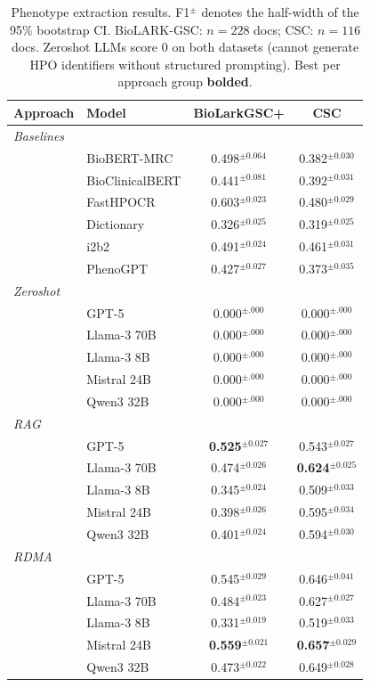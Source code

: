 \begin{table}[t]
\centering\small\setlength{\tabcolsep}{5pt}
\caption{Phenotype extraction results. F1$^{\pm}$ denotes the half-width of the 95\% bootstrap CI.
BioLARK-GSC: $n{=}228$ docs; CSC: $n{=}116$ docs.
Zeroshot LLMs score 0 on both datasets (cannot generate HPO identifiers without structured prompting).
Best per approach group \textbf{bolded}.}
\label{tab:phenotype_ci}
\begin{tabular}{llcc}
\toprule
\textbf{Approach} & \textbf{Model} & \textbf{BioLarkGSC+} & \textbf{CSC} \\
\midrule
\multicolumn{4}{l}{\textit{Baselines}} \\
& BioBERT-MRC & 0.498$^{\pm0.064}$ & 0.382$^{\pm0.030}$ \\
& BioClinicalBERT & 0.441$^{\pm0.081}$ & 0.392$^{\pm0.031}$ \\
& FastHPOCR & 0.603$^{\pm0.023}$ & 0.480$^{\pm0.029}$ \\
& Dictionary & 0.326$^{\pm0.025}$ & 0.319$^{\pm0.025}$ \\
& i2b2 & 0.491$^{\pm0.024}$ & 0.461$^{\pm0.031}$ \\
& PhenoGPT & 0.427$^{\pm0.027}$ & 0.373$^{\pm0.035}$ \\
\midrule
\multicolumn{4}{l}{\textit{Zeroshot}} \\
& GPT-5 & 0.000$^{\pm.000}$ & 0.000$^{\pm.000}$ \\
& Llama-3 70B & 0.000$^{\pm.000}$ & 0.000$^{\pm.000}$ \\
& Llama-3 8B & 0.000$^{\pm.000}$ & 0.000$^{\pm.000}$ \\
& Mistral 24B & 0.000$^{\pm.000}$ & 0.000$^{\pm.000}$ \\
& Qwen3 32B & 0.000$^{\pm.000}$ & 0.000$^{\pm.000}$ \\
\midrule
\multicolumn{4}{l}{\textit{RAG}} \\
& GPT-5 & \textbf{0.525}$^{\pm0.027}$ & 0.543$^{\pm0.027}$ \\
& Llama-3 70B & 0.474$^{\pm0.026}$ & \textbf{0.624}$^{\pm0.025}$ \\
& Llama-3 8B & 0.345$^{\pm0.024}$ & 0.509$^{\pm0.033}$ \\
& Mistral 24B & 0.398$^{\pm0.026}$ & 0.595$^{\pm0.034}$ \\
& Qwen3 32B & 0.401$^{\pm0.024}$ & 0.594$^{\pm0.030}$ \\
\midrule
\multicolumn{4}{l}{\textit{RDMA}} \\
& GPT-5 & 0.545$^{\pm0.029}$ & 0.646$^{\pm0.041}$ \\
& Llama-3 70B & 0.484$^{\pm0.023}$ & 0.627$^{\pm0.027}$ \\
& Llama-3 8B & 0.331$^{\pm0.019}$ & 0.519$^{\pm0.033}$ \\
& Mistral 24B & \textbf{0.559}$^{\pm0.021}$ & \textbf{0.657}$^{\pm0.029}$ \\
& Qwen3 32B & 0.473$^{\pm0.022}$ & 0.649$^{\pm0.028}$ \\
\bottomrule
\end{tabular}
\end{table}

